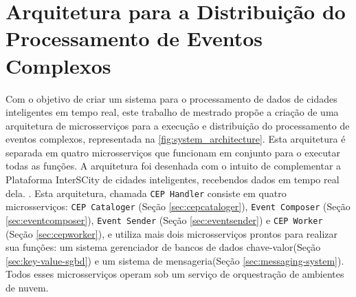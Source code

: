 \chapter{Arquitetura para a Distribuição do Processamento de Eventos Complexos}
\label{cap:arquitetura}

Com o objetivo de criar um sistema para o processamento de dados de cidades inteligentes em tempo real, este trabalho de mestrado propõe a criação de uma arquitetura de microsserviços para a execução e distribuição do processamento de eventos complexos, representada na \autoref{fig:system_architecture}. Esta arquitetura é separada em quatro microsserviços que funcionam em conjunto para o executar todas as funções. A arquitetura foi desenhada com o intuito de complementar a Plataforma InterSCity de cidades inteligentes, recebendos dados em tempo real dela. %
. Esta arquitetura, chamada \texttt{CEP Handler} consiste em quatro microsserviços: \texttt{CEP Cataloger} (Seção \ref{sec:cepcataloger}), \texttt{Event Composer} (Seção \ref{sec:eventcomposer}), \texttt{Event Sender} (Seção  \ref{sec:eventsender}) e \texttt{CEP Worker} (Seção \ref{sec:cepworker}), e utiliza mais dois microsserviços prontos para realizar sua funções: um sistema gerenciador de bancos de dados chave-valor(Seção  \ref{sec:key-value-sgbd}) e um sistema de mensageria(Seção  \ref{sec:messaging-system}). Todos esses microsserviços operam sob um serviço de orquestração de ambientes de nuvem.



